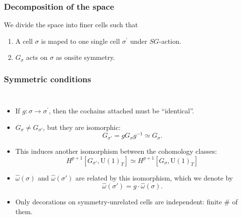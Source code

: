 \documentclass[xcolor=table, 10pt, aspectratio=43]{beamer}
\newcommand{\uone}{\mathrm U(1)}
\begin{document}
\begin{frame}
	\frametitle{Decomposition of the space}
	We divide the space into finer cells such that
	\begin{enumerate}
		\item A cell $\sigma$ is maped to one single cell $\sigma^\prime$ under $SG$-action.
		\item $G_\sigma$ acts on $\sigma$ as onsite symmetry.
	\end{enumerate}
	\begin{center}
	\end{center}
\end{frame}

\begin{frame}
	\frametitle{Symmetric conditions}
	\begin{columns}
		\begin{itemize}
			\item If $g:\sigma\rightarrow\sigma^\prime$, then the cochains attached must be ``identical''.
			\item $G_\sigma\neq G_{\sigma'}$, but they are isomorphic:
			\[G_{\sigma'}=gG_\sigma g^{-1}\simeq G_\sigma.\]
			\item This induces another isomorphism between the cohomology classes:
			\[H^{p+1}[G_{\sigma'},\uone_T]\simeq H^{p+1}[G_\sigma,\uone_T]\]
			\item $\hat\omega(\sigma)$ and $\hat\omega(\sigma')$ are related by this isomorphism, which we denote by
			\[\hat\omega(\sigma') = g\cdot \hat\omega(\sigma).\]
			\item Only decorations on symmetry-unrelated cells are independent: finite \# of them.
		\end{itemize}
	\end{columns}
\end{frame}
\end{document}

